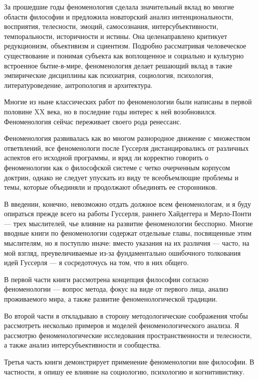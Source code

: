 \documentclass[11pt]{book}
\begin{document}
За прошедшие годы феноменология сделала значительный вклад во многие области философии и предложила новаторский анализ интенциональности, восприятия, телесности, эмоций, самосознания, интерсубъективности, темпоральности, историчности и истины. Она целенаправлено критикует редукционизм, объективизм и сциентизм. Подробно рассматривая человеческое существование и понимая субъекта как воплощенное и социально и культурно встроенное бытие-в-мире, феноменология делает решающий вклад в такие эмпирические дисциплины как психиатрия, социология, психология, литературоведение, антропология и архитектура.

Многие из ныне классических работ по феноменологии были написаны в первой половине XX века, но в последние годы интерес к ней возобновился. Феноменология сейчас переживает своего рода ренессанс.

Феноменология развивалась как во многом разнородное движение с множеством ответвлений, все феноменологи после Гуссерля дистанцировались от различных аспектов его исходной программы, и вряд ли корректно говорить о феноменологии как о философской системе с четко очерченным корпусом доктрин, однако не следует упускать из виду те всеобъемлющие проблемы и темы, которые объединяли и продолжают объединять ее сторонников.

В введении, конечно, невозможно отдать должное всем феноменологам, и я буду опираться прежде всего на работы Гуссерля, раннего Хайдеггера и Мерло-Понти --- трех мыслителей, чье влияние на развитие феноменологии бесспорно. Многие вводные книги по феноменологии содержат отдельные главы, посвященные этим мыслителям, но я поступлю иначе: вместо указания на их различия --- часто, на мой взгляд, преувеличиваемые из-за фундаментально ошибочного толкования идей Гуссерля --- я сосредоточусь на том, что в них общего.

В первой части книги рассмотрена концепция философии согласно феноменологии --- вопрос метода, фокус на виде от первого лица, анализ проживаемого мира, а также развитие феноменологической традиции.

Во второй части я откладываю в сторону методологические соображения чтобы рассмотреть несколько примеров и моделей феноменологического анализа. Я рассмотрю феноменологические исследования пространственности и телесности, а также анализ интерсубъективности и сообщества.

Третья часть книги демонстрирует применение феноменологии вне философии. В частности, я опишу ее влияние на социологию, психологию и когнитивистику.
\end{document}
